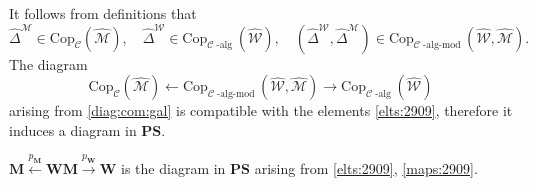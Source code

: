 \documentclass[10pt]{amsart}
\newcommand{\DR}{\mathrm{DR}}
\numberwithin{equation}{subsection}
\begin{document}


It follows from definitions that  
\begin{equation}\label{elts:2909}
\hat\Delta^{\mathcal M}\in\mathrm{Cop}_{\mathcal C}(\hat{\mathcal M}), \quad 
\hat\Delta^{\mathcal W}\in\mathrm{Cop}_{\mathcal C\operatorname{-alg}}(\hat{\mathcal W}), \quad 
(\hat\Delta^{\mathcal W},\hat\Delta^{\mathcal M})\in\mathrm{Cop}_{\mathcal C\operatorname{-alg-mod}}
(\hat{\mathcal W},\hat{\mathcal M}).     
\end{equation}
The diagram 
\begin{equation}\label{maps:2909}
\mathrm{Cop}_{\mathcal C}(\hat{\mathcal M})\leftarrow 
\mathrm{Cop}_{\mathcal C\operatorname{-alg-mod}}(\hat{\mathcal W},\hat{\mathcal M})\to 
\mathrm{Cop}_{\mathcal C\operatorname{-alg}}(\hat{\mathcal W})
\end{equation}
arising from \eqref{diag:com:gal} is compatible with the elements \eqref{elts:2909}, therefore
it induces a diagram in $\mathbf{PS}$.

\begin{defn}\label{def:M:W:MW}
     $\mathbf M\stackrel{p_{\mathbf M}}{\leftarrow}\mathbf{WM}\stackrel{p_{\mathbf W}}{\to} 
\mathbf{W}$ is the diagram in $\mathbf{PS}$ arising from \eqref{elts:2909}, \eqref{maps:2909}. 
\end{defn}
\end{document}
